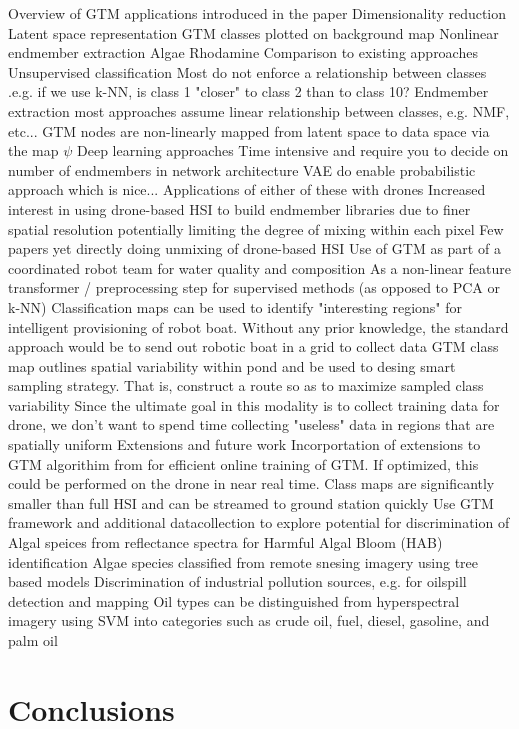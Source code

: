 \documentclass{article}
\begin{document}
\begin{outline}[enumerate]
\1 Overview of GTM applications introduced in the paper
    \2 Dimensionality reduction
        \3 Latent space representation
        \3 GTM classes plotted on background map
    \2 Nonlinear endmember extraction
        \3 Algae 
        \3 Rhodamine
\1 Comparison to existing approaches
    \2 Unsupervised classification
        \3 Most do not enforce a relationship between classes .e.g. if we use k-NN, is class 1 "closer" to class 2 than to class 10? 
    \2 Endmember extraction 
        \3 most approaches assume linear relationship between classes, e.g. NMF, etc... 
        \3 GTM nodes are non-linearly mapped from latent space to data space via the map $\psi$
    \2 Deep learning approaches
        \3 Time intensive and require you to decide on number of endmembers in network architecture
        \3 VAE do enable probabilistic approach which is nice...
\1 Applications of either of these with drones 
    \2 Increased interest in using drone-based HSI to build endmember libraries due to finer spatial resolution potentially limiting the degree of mixing within each pixel
    \2 Few papers yet directly doing unmixing of drone-based HSI
\1 Use of GTM as part of a coordinated robot team for water quality and composition
    \2 As a non-linear feature transformer / preprocessing step for supervised methods (as opposed to PCA or k-NN) 
    \2 Classification maps can be used to identify "interesting regions" for intelligent provisioning of robot boat.
        \3 Without any prior knowledge, the standard approach would be to send out robotic boat in a grid to collect data
        \3 GTM class map outlines spatial variability within pond and be used to desing smart sampling strategy. That is, construct a route so as to maximize sampled class variability 
            \4 Since the ultimate goal in this modality is to collect training data for drone, we don't want to spend time collecting "useless" data in regions that are spatially uniform
\1 Extensions and future work
    \2 Incorportation of extensions to GTM algorithim from \cite{gtm-bishop-2} for efficient online training of GTM.
        \3 If optimized, this could be performed on the drone in near real time.
        \3 Class maps are significantly smaller than full HSI and can be streamed to ground station quickly
    \2 Use  GTM framework and additional datacollection to explore potential for 
        \3 discrimination of Algal speices from reflectance spectra for Harmful Algal Bloom (HAB) identification
            \4 Algae species classified from remote snesing imagery using tree based models\cite{ghatkar2019classification}
        \3 Discrimination of industrial pollution sources, e.g. for oilspill detection and mapping
            \4 Oil types can be distinguished from hyperspectral imagery using SVM into categories such as crude oil, fuel, diesel, gasoline, and palm oil \cite{yang2020characterization}
\end{outline}


\section*{Conclusions}



\end{document}
